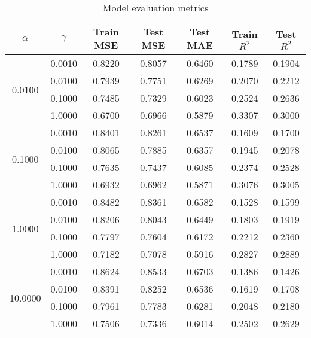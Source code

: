 \begin{table}[ht]\centering
    \caption{Model evaluation metrics}
    \label{tab:metrics}
    \begin{tabular}{ccccccc}
    \toprule
    \textbf{$\alpha$} & \textbf{$\gamma$} & \textbf{Train MSE} & \textbf{Test MSE} & \textbf{Test MAE} & \textbf{Train $R^2$} & \textbf{Test $R^2$} \\
    \midrule
    \multirow{4}{*}{0.0100} & 0.0010 & 0.8220 & 0.8057 & 0.6460 & 0.1789 & 0.1904 \\
                            & 0.0100 & 0.7939 & 0.7751 & 0.6269 & 0.2070 & 0.2212 \\
                            & 0.1000 & 0.7485 & 0.7329 & 0.6023 & 0.2524 & 0.2636 \\
                            & 1.0000 & 0.6700 & 0.6966 & 0.5879 & 0.3307 & 0.3000 \\
    \multirow{4}{*}{0.1000} & 0.0010 & 0.8401 & 0.8261 & 0.6537 & 0.1609 & 0.1700 \\
                            & 0.0100 & 0.8065 & 0.7885 & 0.6357 & 0.1945 & 0.2078 \\
                            & 0.1000 & 0.7635 & 0.7437 & 0.6085 & 0.2374 & 0.2528 \\
                            & 1.0000 & 0.6932 & 0.6962 & 0.5871 & 0.3076 & 0.3005 \\
    \multirow{4}{*}{1.0000} & 0.0010 & 0.8482 & 0.8361 & 0.6582 & 0.1528 & 0.1599 \\
                            & 0.0100 & 0.8206 & 0.8043 & 0.6449 & 0.1803 & 0.1919 \\
                            & 0.1000 & 0.7797 & 0.7604 & 0.6172 & 0.2212 & 0.2360 \\
                            & 1.0000 & 0.7182 & 0.7078 & 0.5916 & 0.2827 & 0.2889 \\
    \multirow{4}{*}{10.0000} & 0.0010 & 0.8624 & 0.8533 & 0.6703 & 0.1386 & 0.1426 \\
                             & 0.0100 & 0.8391 & 0.8252 & 0.6536 & 0.1619 & 0.1708 \\
                             & 0.1000 & 0.7961 & 0.7783 & 0.6281 & 0.2048 & 0.2180 \\
                             & 1.0000 & 0.7506 & 0.7336 & 0.6014 & 0.2502 & 0.2629 \\
    \bottomrule
    \end{tabular}
\end{table}


